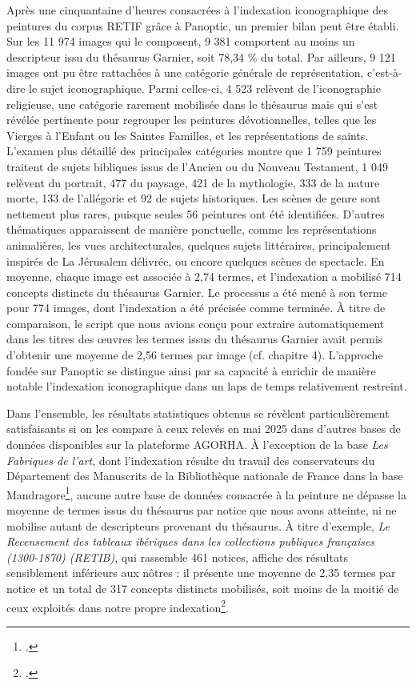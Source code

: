 Après une cinquantaine d’heures consacrées à l’indexation iconographique des peintures du corpus RETIF grâce à Panoptic, un premier bilan peut être établi. Sur les 11 974 images qui le composent, 9 381 comportent au moins un descripteur issu du thésaurus Garnier, soit 78,34 \% du total. Par ailleurs, 9 121 images ont pu être rattachées à une catégorie générale de représentation, c’est-à-dire le sujet iconographique. Parmi celles-ci, 4 523 relèvent de l’iconographie religieuse, une catégorie rarement mobilisée dans le thésaurus mais qui s’est révélée pertinente pour regrouper les peintures dévotionnelles, telles que les Vierges à l’Enfant ou les Saintes Familles, et les représentations de saints. L’examen plus détaillé des principales catégories montre que 1 759 peintures traitent de sujets bibliques issus de l’Ancien ou du Nouveau Testament, 1 049 relèvent du portrait, 477 du paysage, 421 de la mythologie, 333 de la nature morte, 133 de l’allégorie et 92 de sujets historiques. Les scènes de genre sont nettement plus rares, puisque seules 56 peintures ont été identifiées. D’autres thématiques apparaissent de manière ponctuelle, comme les représentations animalières, les vues architecturales, quelques sujets littéraires, principalement inspirés de La Jérusalem délivrée, ou encore quelques scènes de spectacle. En moyenne, chaque image est associée à 2,74 termes, et l’indexation a mobilisé 714 concepts distincts du thésaurus Garnier. Le processus a été mené à son terme pour 774 images, dont l’indexation a été précisée comme terminée. À titre de comparaison, le script que nous avions conçu pour extraire automatiquement dans les titres des œuvres les termes issus du thésaurus Garnier avait permis d’obtenir une moyenne de 2,56 termes par image (cf. chapitre 4). L’approche fondée sur Panoptic se distingue ainsi par sa capacité à enrichir de manière notable l’indexation iconographique dans un laps de temps relativement restreint.

Dans l’ensemble, les résultats statistiques obtenus se révèlent particulièrement satisfaisants si on les compare à ceux relevés en mai 2025 dans d’autres bases de données disponibles sur la plateforme AGORHA. À l’exception de la base \textit{Les Fabriques de l’art}, dont l’indexation résulte du travail des conservateurs du Département des Manuscrits de la Bibliothèque nationale de France dans la base Mandragore\footcite{institutnationaldhistoiredelartFabriqueLartCouleurs}, aucune autre base de données consacrée à la peinture ne dépasse la moyenne de termes issus du thésaurus par notice que nous avons atteinte, ni ne mobilise autant de descripteurs provenant du thésaurus. À titre d’exemple, \textit{Le Recensement des tableaux ibériques dans les collections publiques françaises (1300-1870) (RETIB)}, qui rassemble 461 notices, affiche des résultats sensiblement inférieurs aux nôtres : il présente une moyenne de 2,35 termes par notice et un total de 317 concepts distincts mobilisés, soit moins de la moitié de ceux exploités dans notre propre indexation\footcite{institutnationaldhistoiredelartRecensementTableauxIberiques}.

